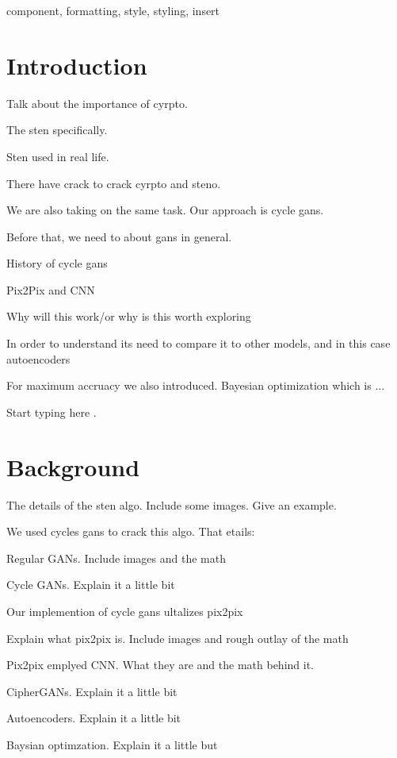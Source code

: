 \documentclass[conference]{IEEEtran}
\begin{document}

\begin{IEEEkeywords}
component, formatting, style, styling, insert
\end{IEEEkeywords}

\section{Introduction}

Talk about the importance of cyrpto. 

The sten specifically. 

Sten used in real life.

There have crack to crack cyrpto and steno. 

We are also taking on the same task. Our approach is cycle gans. 

Before that, we need to about gans in general. 

History of cycle gans 

Pix2Pix and CNN

Why will this work/or why is this worth exploring 

In order to understand its need to compare it to other models, and in this case autoencoders

For maximum accruacy we also introduced. Bayesian optimization which is ...

Start typing here \cite{b1}.

\section{Background}

The details of the sten algo. Include some images. Give an example. 

We used cycles gans to crack this algo. That etails: 

Regular GANs. Include images and the math

Cycle GANs. Explain it a little bit 

Our implemention of cycle gans ultalizes pix2pix

Explain what pix2pix is. Include images and rough outlay of the math 

Pix2pix emplyed CNN. What they are and the math behind it. 

CipherGANs. Explain it a little bit

Autoencoders. Explain it a little bit 

Baysian optimzation. Explain it a little but
\end{document}
